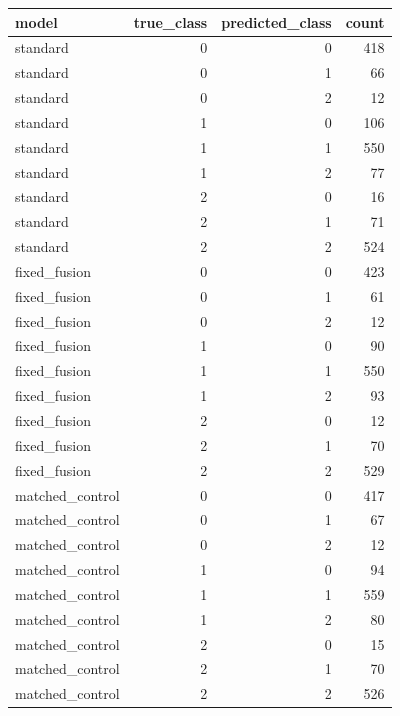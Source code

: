\begin{tabular}{lrrr}
\toprule
model & true\_class & predicted\_class & count \\
\midrule
standard & 0 & 0 & 418 \\
standard & 0 & 1 & 66 \\
standard & 0 & 2 & 12 \\
standard & 1 & 0 & 106 \\
standard & 1 & 1 & 550 \\
standard & 1 & 2 & 77 \\
standard & 2 & 0 & 16 \\
standard & 2 & 1 & 71 \\
standard & 2 & 2 & 524 \\
fixed\_fusion & 0 & 0 & 423 \\
fixed\_fusion & 0 & 1 & 61 \\
fixed\_fusion & 0 & 2 & 12 \\
fixed\_fusion & 1 & 0 & 90 \\
fixed\_fusion & 1 & 1 & 550 \\
fixed\_fusion & 1 & 2 & 93 \\
fixed\_fusion & 2 & 0 & 12 \\
fixed\_fusion & 2 & 1 & 70 \\
fixed\_fusion & 2 & 2 & 529 \\
matched\_control & 0 & 0 & 417 \\
matched\_control & 0 & 1 & 67 \\
matched\_control & 0 & 2 & 12 \\
matched\_control & 1 & 0 & 94 \\
matched\_control & 1 & 1 & 559 \\
matched\_control & 1 & 2 & 80 \\
matched\_control & 2 & 0 & 15 \\
matched\_control & 2 & 1 & 70 \\
matched\_control & 2 & 2 & 526 \\
\bottomrule
\end{tabular}
